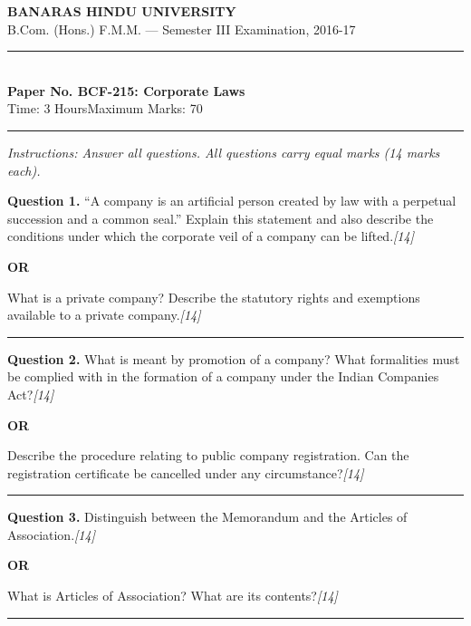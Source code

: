 \documentclass[11pt,a4paper]{article}
\newcommand{\pts}[1]{\hfill   \textit{[#1]}}
\begin{document}
\begin{center}
  {\large\bfseries BANARAS HINDU UNIVERSITY}\\[2pt]
  {\normalsize B.Com. (Hons.) F.M.M. --- Semester III Examination, 2016-17}\\[6pt]
  \rule{0.8\linewidth}{0.5pt}\\[6pt]
  {\large\bfseries Paper No. BCF-215: Corporate Laws}\\[4pt]
  {\normalsize Time: 3 Hours\hfill Maximum Marks: 70}
\end{center}

\rule{\linewidth}{0.4pt}

\smallskip



\noindent   \textit{Instructions: Answer all questions. All questions carry equal marks (14 marks each).}

\bigskip




\noindent   \textbf{Question 1.}
``A company is an artificial person created by law with a perpetual succession and a common seal.'' Explain this statement and also describe the conditions under which the corporate veil of a company can be lifted.\pts{14}

\centerline{   \textbf{OR}}

What is a private company? Describe the statutory rights and exemptions available to a private company.\pts{14}

\medskip\rule{\linewidth}{0.2pt}




\noindent   \textbf{Question 2.}
What is meant by promotion of a company? What formalities must be complied with in the formation of a company under the Indian Companies Act?\pts{14}

\centerline{   \textbf{OR}}

Describe the procedure relating to public company registration. Can the registration certificate be cancelled under any circumstance?\pts{14}

\medskip\rule{\linewidth}{0.2pt}




\noindent   \textbf{Question 3.}
Distinguish between the Memorandum and the Articles of Association.\pts{14}

\centerline{   \textbf{OR}}

What is Articles of Association? What are its contents?\pts{14}

\medskip\rule{\linewidth}{0.2pt}
\end{document}
